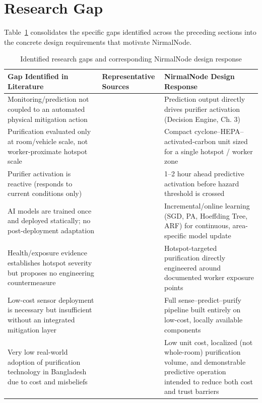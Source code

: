 \section{Research Gap}
\label{sec:lr-research-gap}

Table~\ref{tab:lr-gap} consolidates the specific gaps identified across the preceding sections into the concrete design requirements that motivate NirmalNode.

\begin{table}[htbp]
\centering
\caption{Identified research gaps and corresponding NirmalNode design response}
\label{tab:lr-gap}
\small
\begin{tabular}{@{}p{4.3cm}p{4.0cm}p{4.6cm}@{}}
\toprule
\textbf{Gap Identified in Literature} & \textbf{Representative Sources} & \textbf{NirmalNode Design Response} \\
\midrule
Monitoring/prediction not coupled to an automated physical mitigation action & \citep{alam2025iot,zhang2020realtime,kataria2022aiiot,mani2021aipowered} & Prediction output directly drives purifier activation (Decision Engine, Ch. 3) \\
Purification evaluated only at room/vehicle scale, not worker-proximate hotspot scale & \citep{dubey2021assessing,lu2023realworld,lee2022effect,chen2022efficacy,chen2025fine} & Compact cyclone--HEPA--activated-carbon unit sized for a single hotspot / worker zone \\
Purifier activation is reactive (responds to current conditions only) & \citep{dubey2021assessing,lu2023realworld,lee2022effect} & 1--2 hour ahead predictive activation before hazard threshold is crossed \\
AI models are trained once and deployed statically; no post-deployment adaptation & \citep{alam2025iot,zhang2020realtime,kataria2022aiiot,mani2021aipowered} & Incremental/online learning (SGD, PA, Hoeffding Tree, ARF) for continuous, area-specific model update \\
Health/exposure evidence establishes hotspot severity but proposes no engineering countermeasure & \citep{nasri2023pm25,sekhavati2023particulate,alhadhrami2024pm25mental,rahman2025perceived} & Hotspot-targeted purification directly engineered around documented worker exposure points \\
Low-cost sensor deployment is necessary but insufficient without an integrated mitigation layer & \citep{shabbir2025paradigm,karmakar2024exploring,noman2025aiair} & Full sense--predict--purify pipeline built entirely on low-cost, locally available components \\
Very low real-world adoption of purification technology in Bangladesh due to cost and misbeliefs & \citep{chowdhury2025misbeliefs} & Low unit cost, localized (not whole-room) purification volume, and demonstrable predictive operation intended to reduce both cost and trust barriers \\
\bottomrule
\end{tabular}
\end{table}

